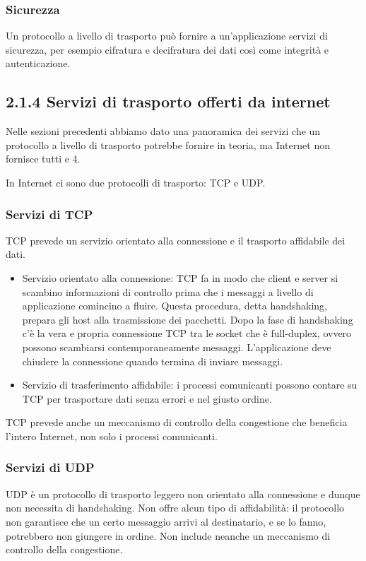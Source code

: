 \documentclass{book}
\begin{document}
\subsubsection*{Sicurezza}
Un protocollo a livello di trasporto può fornire a un'applicazione servizi di sicurezza, per esempio cifratura e decifratura dei dati così come integrità e autenticazione.

\subsection*{2.1.4 Servizi di trasporto offerti da internet}
Nelle sezioni precedenti abbiamo dato una panoramica dei servizi che un protocollo a livello di trasporto potrebbe fornire in teoria, ma Internet non fornisce tutti e 4.

In Internet ci sono due protocolli di trasporto: TCP e UDP.

\subsubsection*{Servizi di TCP}
TCP prevede un servizio orientato alla connessione e il trasporto affidabile dei dati.

\begin{itemize}
	\item Servizio orientato alla connessione: TCP fa in modo che client e server si scambino informazioni di controllo prima che i messaggi a livello di applicazione comincino a fluire. Questa procedura, detta handshaking, prepara gli host alla trasmissione dei pacchetti. Dopo la fase di handshaking c'è la vera e propria connessione TCP tra le socket che è full-duplex, ovvero possono scambiarsi contemporaneamente messaggi. L'applicazione deve chiudere la connessione quando termina di inviare messaggi.
	
	\item Servizio di trasferimento affidabile: i processi comunicanti possono contare su TCP per trasportare dati senza errori e nel giusto ordine.
\end{itemize}

TCP prevede anche un meccanismo di controllo della congestione che beneficia l'intero Internet, non solo i processi comunicanti.

\subsubsection*{Servizi di UDP}
UDP è un protocollo di trasporto leggero non orientato alla connessione e dunque non necessita di handshaking. Non offre alcun tipo di affidabilità: il protocollo non garantisce che un certo messaggio arrivi al destinatario, e se lo fanno, potrebbero non giungere in ordine. Non include neanche un meccanismo di controllo della congestione.
\end{document}
